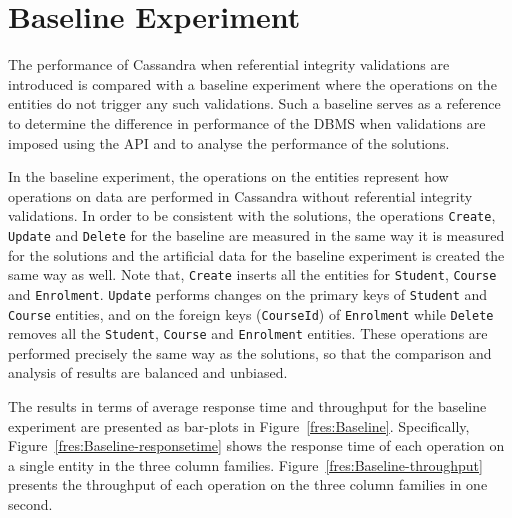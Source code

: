 \section{Baseline Experiment} \label{s:results-Baseline}

The performance of Cassandra when referential
integrity validations are introduced  is compared with
 a baseline experiment where the operations on the entities do not trigger any
such validations.  Such a baseline serves as a reference to determine the
difference in performance of the \ac{DBMS} when validations are imposed using
the \ac{API} and to analyse the performance of the solutions. 

In the baseline experiment,  the operations on the entities represent how
operations on data are performed in Cassandra without referential integrity
validations. In order to be consistent with the solutions, the operations
\texttt{Create}, \texttt{Update} and \texttt{Delete} for the baseline are
measured in the same way it is measured for the solutions and the artificial
data for the baseline experiment is created the same way as well.
Note that, \texttt{Create} inserts all the entities for \texttt{Student},
\texttt{Course} and \texttt{Enrolment}.  \texttt{Update} performs changes on the
primary keys of \texttt{Student} and \texttt{Course} entities,  and on the
foreign keys (\texttt{CourseId}) of \texttt{Enrolment} while \texttt{Delete}
removes all the \texttt{Student},  \texttt{Course} and \texttt{Enrolment}
entities. These operations are performed precisely the same way as the
solutions, so that the comparison and analysis of results are balanced and
unbiased.

The results in terms of average response time and throughput for the baseline
experiment are presented as  bar-plots in Figure~\ref{fres:Baseline}. 
Specifically,  Figure~\ref{fres:Baseline-responsetime} shows the response time 
of each operation on a single entity in the three column families. 
Figure~\ref{fres:Baseline-throughput} presents the throughput of each operation
on the three column families in one second. 

	
